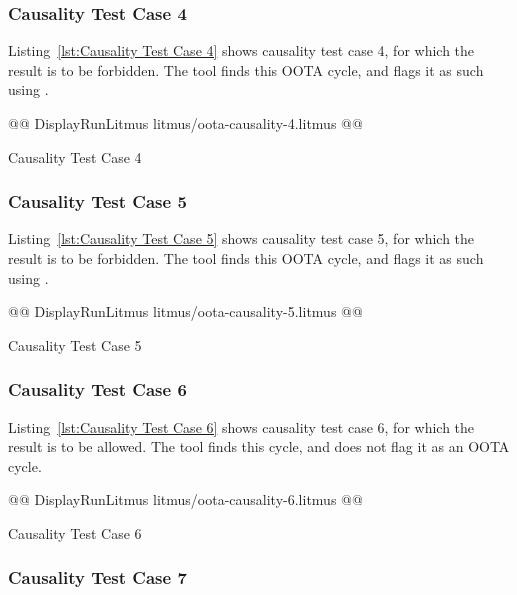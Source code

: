 \documentclass[10]{article}
\begin{document}
\subsubsection{Causality Test Case 4}
\label{app:Causality Test Case 4}

Listing~\ref{lst:Causality Test Case 4}
shows causality test case 4, for which the  result
is to be forbidden.
The  tool finds this OOTA cycle, and flags it as such using .

\begin{listing}[tbp]
@@ DisplayRunLitmus litmus/oota-causality-4.litmus @@
\caption{Causality Test Case 4}
\label{lst:Causality Test Case 4}
\end{listing}

\subsubsection{Causality Test Case 5}
\label{app:Causality Test Case 5}

Listing~\ref{lst:Causality Test Case 5}
shows causality test case 5, for which the 
result is to be forbidden.
The  tool finds this OOTA cycle, and flags it as such using .

\begin{listing}[tbp]
@@ DisplayRunLitmus litmus/oota-causality-5.litmus @@
\caption{Causality Test Case 5}
\label{lst:Causality Test Case 5}
\end{listing}

\subsubsection{Causality Test Case 6}
\label{app:Causality Test Case 6}

Listing~\ref{lst:Causality Test Case 6}
shows causality test case 6, for which the 
result is to be allowed.
The  tool finds this cycle, and does not flag it as an OOTA cycle.

\begin{listing}[tbp]
@@ DisplayRunLitmus litmus/oota-causality-6.litmus @@
\caption{Causality Test Case 6}
\label{lst:Causality Test Case 6}
\end{listing}

\subsubsection{Causality Test Case 7}
\label{app:Causality Test Case 7}
\end{document}

